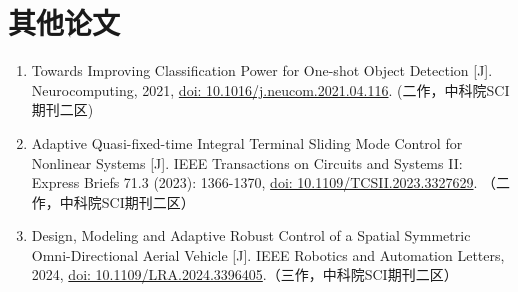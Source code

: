 \begin{sloppypar}
\section*{其他论文}
\begin{enumerate}
    \item Towards Improving Classification Power for One-shot Object Detection [J]. Neurocomputing, 2021, \href{https://doi.org/10.1016/j.neucom.2021.04.116}{doi: 10.1016/j.neucom.2021.04.116}. (二作，中科院SCI期刊二区)
    \item Adaptive Quasi-fixed-time Integral Terminal Sliding Mode Control for Nonlinear Systems [J]. IEEE Transactions on Circuits and Systems II: Express Briefs 71.3 (2023): 1366-1370, \href{https://doi.org/10.1109/TCSII.2023.3327629}{doi: 10.1109/TCSII.2023.3327629}. （二作，中科院SCI期刊二区）
    \item Design, Modeling and Adaptive Robust Control of a Spatial Symmetric Omni-Directional Aerial Vehicle [J]. IEEE Robotics and Automation Letters, 2024, \href{https://doi.org/10.1109/LRA.2024.3396405}{doi: 10.1109/LRA.2024.3396405}.（三作，中科院SCI期刊二区）
\end{enumerate}
\end{sloppypar}